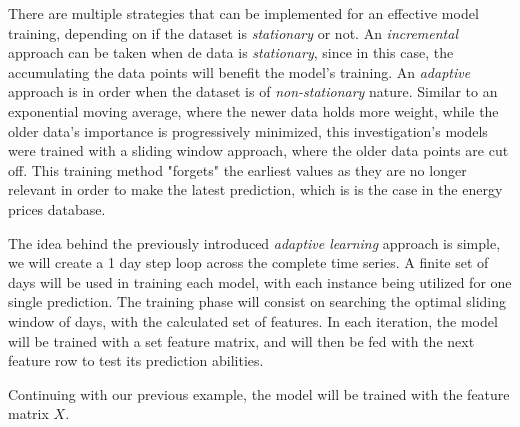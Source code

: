 \documentclass[12pt]{report} %
\begin{document}
There are multiple strategies that can be implemented for an effective model training, depending on if the dataset is \textit{stationary} or not. An \textit{incremental} approach can be taken when de data is  \textit{stationary}, since in this case, the accumulating the data points will benefit the model's training. An \textit{adaptive} approach is in order when the dataset is of \textit{non-stationary} nature. Similar to an exponential moving average, where the newer data holds more weight, while the older data's importance is progressively minimized, this investigation's models were trained with a sliding window approach, where the older data points are cut off. This training method "forgets" the earliest values as they are no longer relevant in order to make the latest prediction, which is is the case in the energy prices database.

The idea behind the previously introduced \textit{adaptive learning} approach is simple, we will create a 1 day step loop across the complete time series. A finite set of days will be used in training each model, with each instance being utilized for one single prediction. The training phase will consist on searching the optimal sliding window of days, with the calculated set of features. In each iteration, the model will be trained with a set feature matrix, and will then be fed with the next feature row to test its prediction abilities.

Continuing with our previous example, the model will be trained with the feature matrix $\mathit{X}$.
\end{document}
